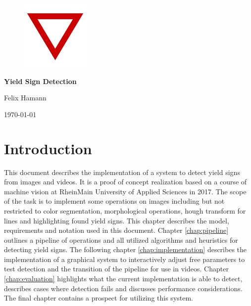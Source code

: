 \documentclass{report}
\begin{document}
%
%


{\centering

  \begin{figure}
    \vspace{3cm}

    \centering
    \includegraphics[width=0.3\textwidth]{src/yield}

    \vspace{4cm}
  \end{figure}


  {\Huge\textbf{Yield Sign Detection}}
  \vspace{.4cm}

  Felix Hamann

  \vspace{.2cm}

  \today

}


%
%

\tableofcontents


\chapter{Introduction}

This document describes the implementation of a system to detect yield
signs from images and videos. It is a proof of concept realization
based on a course of machine vision at RheinMain University of Applied
Sciences in 2017. The scope of the task is to implement some
operations on images including but not restricted to color
segmentation, morphological operations, hough transform for lines and
highlighting found yield signs. This chapter describes the model,
requirements and notation used in this document. Chapter
\ref{chap:pipeline} outlines a pipeline of operations and all utilized
algorithms and heuristics for detecting yield signs. The following
chapter \ref{chap:implementation} describes the implementation of a
graphical system to interactively adjust free parameters to test
detection and the transition of the pipeline for use in
videos. Chapter \ref{chap:evaluation} highlights what the current
implementation is able to detect, describes cases where detection
fails and discusses performance considerations. The final chapter
contains a prospect for utilizing this system.
\end{document}
